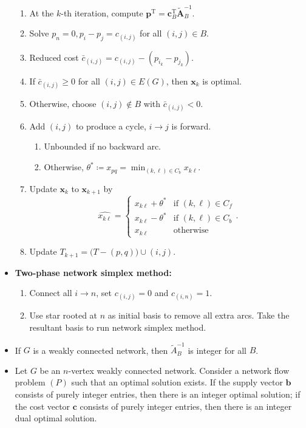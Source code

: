 \documentclass[10pt]{article}
\begin{document}
\begin{multicols*}{3}
\begin{itemize}
\begin{enumerate}
                \item At the $k$-th iteration, compute $\bm{p}^{\mathrm{T}} = \bm{c}^{\mathrm{T}}_{B}\widetilde{\bm{A}}_{B}^{-1}$.
                \item Solve $p_n = 0, p_i - p_j = c_{(i, j)}$ for all $(i, j) \in B$.
                \item Reduced cost $\bar{c}_{(i, j)} = c_{(i, j)} - (p_{i_k} - p_{j_k})$.
                \item If $\bar{c}_{(i, j)} \geq 0$ for all $(i, j) \in E(G)$, then $\bm{x}_k$ is optimal. 
                \item Otherwise, choose $(i, j) \notin B$ with $\bar{c}_{(i, j)} < 0$.
                \item Add $(i, j)$ to produce a cycle, $i \to j$ is forward.
                \begin{enumerate}
                    \item Unbounded if no backward arc.
                    \item Otherwise, $\theta^* \coloneqq x_{pq} = \min_{(k, {\ell}) \in C_b}x_{k\ell}$.
                \end{enumerate}
                \item Update $\bm{x}_k$ to $\bm{x}_{k + 1}$ by 
                \begin{equation*}
                    \widehat{x_{k\ell}} = \begin{cases}
                        x_{k\ell} + \theta^* & \textrm{if } (k, {\ell}) \in C_f \\
                        x_{k\ell} - \theta^* & \textrm{if } (k, {\ell}) \in C_b \\
                        x_{k\ell} & \textrm{otherwise}
                    \end{cases}.
                \end{equation*}
                \item Update $T_{k + 1} = \bigl(T - (p, q)\bigr)\cup (i, j)$.
            \end{enumerate}
            \item \textbf{Two-phase network simplex method:}
            \begin{enumerate}
                \item Connect all $i \to n$, set $c_{(i, j)} = 0$ and $c_{(i, n)} = 1$.
                \item Use star rooted at $n$ as initial basis to remove all extra arcs. Take the resultant basis to run network simplex method.
            \end{enumerate}
            \item If $G$ is a weakly connected network, then $\widetilde{A}_B^{-1}$ is integer for all $B$.
            \item Let $G$ be an $n$-vertex weakly connected network. Consider a network flow problem $(P)$ such that an optimal solution exists. If the supply vector $\bm{b}$ consists of purely integer entries, then there is an integer optimal solution; if the cost vector $\bm{c}$ consists of purely integer entries, then there is an integer dual optimal solution.
        \end{itemize}
    \end{multicols*}
\end{document}

